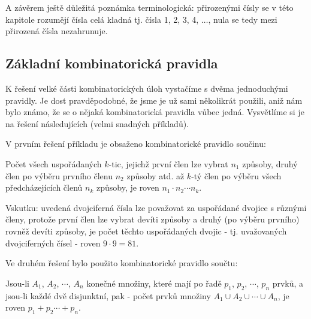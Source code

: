     A závěrem ještě důležitá poznámka terminologická: přirozenými čísly se v této kapitole rozumějí 
    čísla celá kladná tj. čísla 1, 2, 3, 4, \(\ldots\), nula se tedy mezi přirozená čísla 
    nezahrunuje. \cite[s.~7]{calda2008matematika} 
    
    \subsection{Základní kombinatorická pravidla}\label{mai:IchapIVsecIssecI}
      K řešení velké části kombinatorických úloh vystačíme s dvěma jednoduchými pravidly. Je dost
      pravděpodobné, že jsme je už sami několikrát použili, aniž nám bylo známo, že se o nějaká
      kombinatorická pravidla vůbec jedná. Vysvětlíme si je na řešení následujících (velmi snadných
      příkladů).

      

      V prvním řešení příkladu je obsaženo kombinatorické pravidlo součinu:
      
      \begin{mdframed}[style=highlight]
        Počet všech uspořádaných \(k\)-tic, jejichž první člen lze vybrat \(n_1\) způsoby, druhý
        člen po výběru prvního členu \(n_2\) způsoby atd. až \(k\)-tý člen po výběru všech
        předcházejících členů \(n_k\) způsoby, je roven \(n_1\cdot n_2\cdots n_k\).
      \end{mdframed}

      Vskutku: uvedená dvojciferná čísla lze považovat za uspořádané dvojice s různými členy,
      protože první člen lze vybrat devíti způsoby a druhý (po výběru prvního) rovněž devíti
      způsoby, je počet těchto uspořádaných dvojic - tj. uvažovaných dvojciferných čísel - roven
      \(9\cdot9= 81\).

      Ve druhém řešení bylo použito kombinatorické pravidlo součtu:
      
      \begin{mdframed}[style=highlight]       
        Jsou-li \(A_1\), \(A_2\), \(\cdots\), \(A_n\) konečné množiny, které mají po řadě \(p_1\),
        \(p_2\), \(\cdots\), \(p_n\) prvků, a jsou-li každé dvě disjunktní, pak - počet prvků množiny
        \(A_1 \cup A_2 \cup\cdots\cup A_n\), je roven \(p_1 + p_2 \cdots + p_n\).        
      \end{mdframed}

